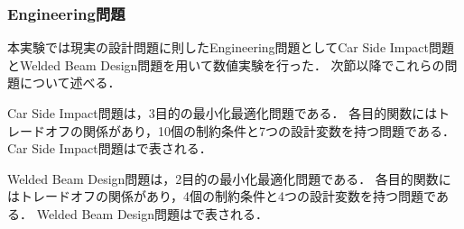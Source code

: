 \documentclass[../main/main]{subfiles}
\begin{document}
\newpage

\subsubsection{Engineering問題}
本実験では現実の設計問題に則したEngineering問題としてCar Side Impact問題\cite{Jain2014Evolutionary2}とWelded Beam Design問題\cite{Deb2006Reference}を用いて数値実験を行った．
次節以降でこれらの問題について述べる．

Car Side Impact問題は，3目的の最小化最適化問題である．
各目的関数にはトレードオフの関係があり，10個の制約条件と7つの設計変数を持つ問題である．
Car Side Impact問題はで表される．

Welded Beam Design問題は，2目的の最小化最適化問題である．
各目的関数にはトレードオフの関係があり，4個の制約条件と4つの設計変数を持つ問題である．
Welded Beam Design問題はで表される．
\end{document}
